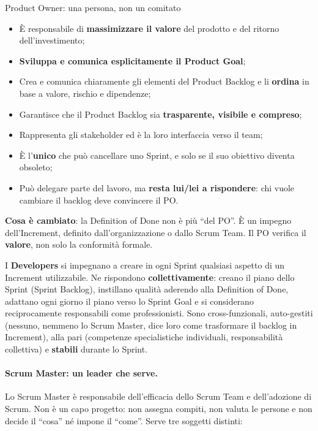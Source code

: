 \documentclass[12pt]{extarticle}
\begin{document}
\begin{cbox}{Product Owner: una persona, non un comitato}
\begin{itemize}
    \item È responsabile di \textbf{massimizzare il valore} del prodotto e del ritorno dell'investimento;
    \item \textbf{Sviluppa e comunica esplicitamente il Product Goal};
    \item Crea e comunica chiaramente gli elementi del Product Backlog e li \textbf{ordina} in base a valore, rischio e dipendenze;
    \item Garantisce che il Product Backlog sia \textbf{trasparente, visibile e compreso};
    \item Rappresenta gli stakeholder ed è la loro interfaccia verso il team;
    \item È l'\textbf{unico} che può cancellare uno Sprint, e solo se il suo obiettivo diventa obsoleto;
    \item Può delegare parte del lavoro, ma \textbf{resta lui/lei a rispondere}: chi vuole cambiare il backlog deve convincere il PO.
\end{itemize}
\medskip
\noindent \textbf{Cosa è cambiato}: la Definition of Done non è più ``del PO''. È un impegno dell'Increment, definito dall'organizzazione o dallo Scrum Team. Il PO verifica il \textbf{valore}, non solo la conformità formale.
\end{cbox}

\noindent I \textbf{Developers} si impegnano a creare in ogni Sprint qualsiasi aspetto di un Increment utilizzabile. Ne rispondono \textbf{collettivamente}: creano il piano dello Sprint (Sprint Backlog), instillano qualità aderendo alla Definition of Done, adattano ogni giorno il piano verso lo Sprint Goal e si considerano reciprocamente responsabili come professionisti. Sono cross-funzionali, auto-gestiti (nessuno, nemmeno lo Scrum Master, dice loro come trasformare il backlog in Increment), alla pari (competenze specialistiche individuali, responsabilità collettiva) e \textbf{stabili} durante lo Sprint.

\paragraph{Scrum Master: un leader che serve.}
Lo Scrum Master è responsabile dell'efficacia dello Scrum Team e dell'adozione di Scrum. Non è un capo progetto: non assegna compiti, non valuta le persone e non decide il ``cosa'' né impone il ``come''. Serve tre soggetti distinti:
\end{document}
